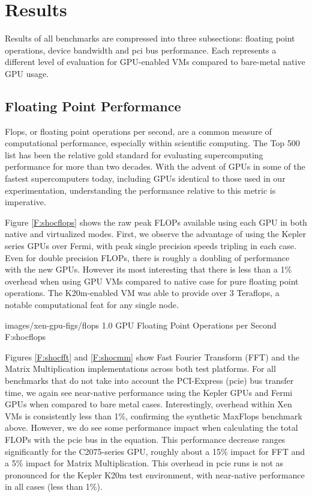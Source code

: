   \section{Results}

Results of all benchmarks are compressed into three subsections: floating point operations, device bandwidth and pci bus performance. Each represents a different level of evaluation for GPU-enabled VMs compared to bare-metal native GPU usage.

\subsection{Floating Point Performance}

Flops, or floating point operations per second, are a common measure of computational performance, especially within scientific computing. The Top 500 list \cite{www-top500} has been the relative gold standard for evaluating supercomputing performance for more than two decades. With the advent of GPUs in some of the fastest supercomputers today, including GPUs identical to those used in our experimentation, understanding the performance relative to this metric is imperative.

Figure \ref{F:shocflops} shows the raw peak FLOPs available using each GPU in both native and virtualized modes. First, we observe the advantage of using the Kepler series GPUs over Fermi, with peak single precision speeds tripling in each case. Even for double precision FLOPs, there is roughly a doubling of performance with the new GPUs. However its most interesting that there is less than a 1\% overhead when using GPU VMs compared to native case for pure floating point operations. The K20m-enabled VM was able to provide over 3 Teraflops, a notable computational feat for any single node.

  {images/xen-gpu-figs/flops}
  {1.0}
  {GPU Floating Point Operations per Second}
  {F:shocflops} 

Figures \ref{F:shocfft} and \ref{F:shocmm} show Fast Fourier Transform (FFT) and the Matrix Multiplication implementations across both test platforms. For all benchmarks that do not take into account the PCI-Express (pcie) bus transfer time, we again see near-native performance using the Kepler GPUs and Fermi GPUs when compared to bare metal cases. Interestingly, overhead within Xen VMs is consistently less than 1\%, confirming the synthetic MaxFlops benchmark above.  However, we do see some performance impact when calculating the total FLOPs with the pcie bus in the equation. This performance decrease ranges significantly for the C2075-series GPU,  roughly about a 15\% impact for FFT and a 5\% impact for Matrix Multiplication.  This overhead in pcie runs is not as pronounced for the Kepler K20m test environment, with near-native performance in all cases (less than 1\%).  


